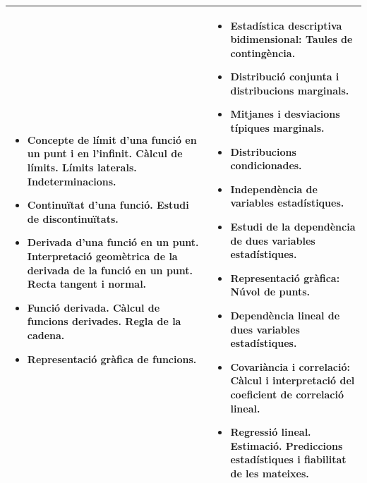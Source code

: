 \begin{center}
\begin{tabular}{|p{}|p{}|}
\begin{itemize}
			\item Concepte de límit d’una funció en un punt i en l’infinit. Càlcul de límits. Límits laterals. Indeterminacions.
			
			\item Continuïtat d’una funció. Estudi de discontinuïtats.
			
			\item Derivada d’una funció en un punt. Interpretació geomètrica de la derivada de la funció en un punt. Recta tangent i normal.
			
			\item Funció derivada. Càlcul de funcions derivades. Regla de la cadena.
			
			\item Representació gràfica de funcions.
			
		\end{itemize}		
		&
		
		\begin{itemize}
			\item 	Estadística descriptiva bidimensional:
			Taules de contingència.
			
			\item Distribució conjunta i distribucions marginals.
			
			\item Mitjanes i desviacions típiques marginals.
			
			\item Distribucions condicionades.
			
			\item Independència de variables estadístiques.
			
			\item Estudi de la dependència de dues variables estadístiques. 
			
			\item Representació gràfica: Núvol de punts.
			
			\item Dependència lineal de dues variables estadístiques. 
			
			\item Covariància i correlació: Càlcul i interpretació del coeficient de correlació lineal.
			
			\item Regressió lineal. Estimació. Prediccions estadístiques i fiabilitat de les mateixes.
		\end{itemize}		
		\\ \hline
		
		
	\end{tabular}	
\end{center}

